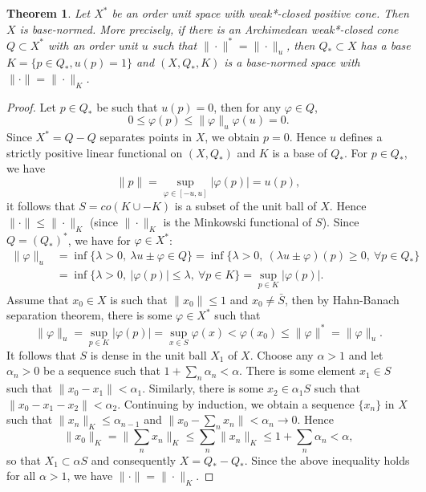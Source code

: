 \documentclass[12pt]{article}
\newtheorem{thm}{Theorem}
\theoremstyle{remark}
\newcommand{\<}{\langle}
\begin{document}
\begin{thm}\cite{ellis, asell} Let $X^*$ be  an order unit space with weak*-closed positive cone. Then $X$ is base-normed. More precisely, 
if there is an Archimedean weak*-closed cone $Q\subset X^*$ with an order unit $u$  such that $\|\cdot\|^*=\|\cdot\|_u$, 
 then  $Q_*\subset X$ has a base $K=\{p\in Q_*, u(p)=1\}$ and $(X,Q_*,K)$ is a base-normed 
space with $\|\cdot\|=\|\cdot\|_K$.

\end{thm}

\begin{proof}
Let $p\in Q_*$ be such that $u(p)=0$, then for any $\varphi\in Q$, 
\[
0\le \varphi(p)\le \|\varphi\|_u\varphi(u)=0.
\]
Since  $X^*=Q-Q$ separates points in $X$, we obtain $p=0$. Hence 
$u$ defines a strictly positive linear functional on $(X,Q_*)$  and $K$ is a base of $Q_*$. 
For $p\in Q_*$, we have
\[
\|p\|=\sup_{\varphi\in [-u,u]}|\varphi(p)|=u(p),
\]
it follows that $S=co(K\cup -K)$ is a subset of the unit ball of $X$. Hence $\|\cdot\|\le \|\cdot\|_K$ (since $\|\cdot\|_K$ is the Minkowski functional of $S$).   Since $Q=(Q_*)^*$, we have for $\varphi\in X^*$:
\begin{align*}
\|\varphi\|_u&=\inf\{\lambda >0,\ \lambda u\pm \varphi\in Q\}=\inf\{\lambda >0,\ (\lambda u\pm \varphi)(p)\ge 0,\ \forall p \in Q_*\}\\
&= \inf\{\lambda>0,\ |\varphi(p)|\le \lambda,\ \forall p\in K\}=\sup_{p\in K}|\varphi(p)|.
\end{align*}
Assume that $x_0\in X$ is such that $\|x_0\|\le 1$ and $x_0\ne \bar S$, then by Hahn-Banach separation theorem, there is some $\varphi\in X^*$ such that 
\[
\|\varphi\|_u=\sup_{p\in K}|\varphi(p)|=\sup_{x\in S}\varphi(x)< \varphi(x_0)\le \|\varphi\|^*=\|\varphi\|_u.
\]
It follows that $S$ is dense in the unit ball $X_1$ of $X$.  Choose any $\alpha>1$ and let $\alpha_n>0$ be a sequence such that  $1+\sum_n\alpha_n<\alpha$. There is some element $x_1\in S$ such that $\|x_0-x_1\|< \alpha_1$. Similarly, there is some $x_2\in \alpha_1S$ 
such that $\|x_0-x_1-x_2\|<\alpha_2$. Continuing by induction, we obtain a sequence $\{x_n\}$ in $X$ such that $\|x_n\|_K\le \alpha_{n-1}$ and  $\|x_0-\sum_n x_n\|<\alpha_n\to 0$. Hence  
\[
\|x_0\|_K=\|\sum_n x_n\|_K\le \sum_n\|x_n\|_K\le 1+\sum_n\alpha_n<\alpha,
\]
so that  $X_1\subset \alpha S$ and consequently $X=Q_*-Q_*$. Since the above inequality holds for all $\alpha>1$, we have
$\|\cdot\|=\|\cdot\|_K$.



%




\end{proof}
\end{document}
